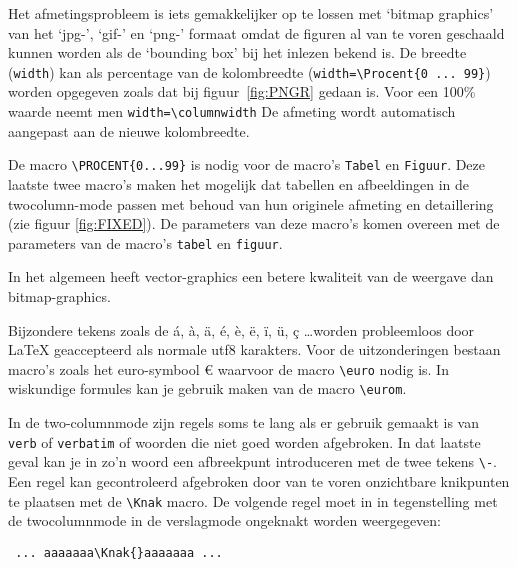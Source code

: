 
Het afmetingsprobleem is iets gemakkelijker op te lossen met `bitmap
graphics' van het `jpg-', `gif-' en `png-' formaat omdat de figuren al
van te voren geschaald kunnen worden als de `bounding box' bij het
inlezen bekend is. De breedte (\verb!width!) kan als percentage van de
kolombreedte (\verb!width=\Procent{0 ... 99}!) worden opgegeven zoals
dat bij figuur~\ref{fig:PNGR} gedaan is. Voor een 100\% waarde neemt
men \verb!width=\columnwidth! De afmeting wordt automatisch
aangepast aan de nieuwe kolombreedte.


\begin{center}
\end{center}


De macro \verb!\PROCENT{0...99}! is nodig voor de macro's \verb!Tabel!
en \verb!Figuur!. Deze laatste twee macro's maken het mogelijk dat
tabellen en afbeeldingen in de twocolumn-mode passen met behoud van
hun originele afmeting en detaillering (zie
figuur \ref{fig:FIXED}). De parameters van deze macro's komen overeen
met de parameters van de macro's \verb!tabel! en \verb!figuur!.


In het algemeen heeft vector-graphics een betere kwaliteit van de
weergave dan bitmap-graphics.



Bijzondere tekens zoals de á, à, ä, é, è, ë, ï, ü, ç \ldots worden
probleemloos door \LaTeX{} geaccepteerd als normale utf8
karakters. Voor de uitzonderingen bestaan macro's zoals het
euro-symbool \euro{} waarvoor de macro \verb!\euro! nodig is. In
wiskundige formules kan je gebruik maken van de macro \verb!\eurom!.


In de two-columnmode zijn regels soms te lang als er gebruik gemaakt
is van \verb!verb! of \verb!verbatim! of woorden die niet goed worden
afgebroken. In dat laatste geval kan je in zo'n woord een afbreekpunt
introduceren met de twee tekens \verb!\-!. Een regel kan gecontroleerd
afgebroken door van te voren onzichtbare knikpunten te plaatsen met de
\verb!\Knak! macro. De volgende regel moet in in tegenstelling met de
twocolumnmode in de verslagmode ongeknakt worden weergegeven:

\begin{Aanpassen}
\begin{verbatim}
 ... aaaaaaa\Knak{}aaaaaaa ...
\end{verbatim}
\end{Aanpassen}


